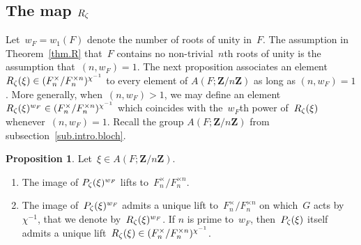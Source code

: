 \documentclass[12pt,reqno]{amsart}
\theoremstyle{definition}
\newtheorem{proposition}[theorem]{Proposition}
\newcommand{\changed}[1]{{#1}}
\newcommand{\frankchanged}[1]{{#1}}
\def\Z{\mathbf Z}   %
\def\nn{n}
\begin{document}
\subsection{The map \texorpdfstring{$R_\zeta$}{Rz}}
\label{sub.Rz}
\changed{Let~$w_F = w_1(F)$ denote the number of roots of unity in~$F$.
The assumption in Theorem~\ref{thm.R} that~$F$ contains no non-trivial~$n$th roots
of unity is the assumption that~$(n,w_F) = 1$.}
The next proposition associates an element 
$R_\z(\xi) \in (F_\nn^{\times}/F_\nn^{\times \nn})^{\chi\i}$ to every element of 
\changed{$A(F;\Z/n\Z)$} as long as $(\nn,w_F)=1$. 
\frankchanged{More generally,
when~$(n,w_F) > 1$, we may define an element~$R_{\z}(\xi)^{w_F}
\in (F_\nn^{\times}/F_\nn^{\times \nn})^{\chi\i}$ which coincides with the~$w_F$th power
of~$R_{\zeta}(\xi)$ whenever~$(n,w_F)=1$.}
Recall the group $A(F;\Z/\nn\Z)$
from subsection~\ref{sub.intro.bloch}.

\begin{proposition}
\label{prop.Pdef} Let~$\xi \in A(F;\Z/\nn\Z)$. 
\begin{enumerate}[label=(\alph*)]
\item \label{newparta}
The image of $P_\zeta(\xi)^{w_F}$ lifts
to~$F_\nn^\times/F_\nn^{\times \nn}$.  
\item \label{newpartb}
The image of~$P_{\zeta}(\xi)^{w_F}$ admits a unique
lift to~$F_\nn^\times/F_\nn^{\times \nn}$ on which~$G$ acts by~$\chi^{-1}$,
\frankchanged{that we denote by~$R_{\zeta}(\xi)^{w_F}$.}
If $\nn$ is prime to~$w_F$, then~$P_{\zeta}(\xi)$ itself admits a
unique lift~$R_\z(\xi) \in (F^{\times}_{\nn}/F^{\times \nn}_{\nn})^{\chi\i}$.
\end{enumerate}
\end{proposition}
\end{document}
